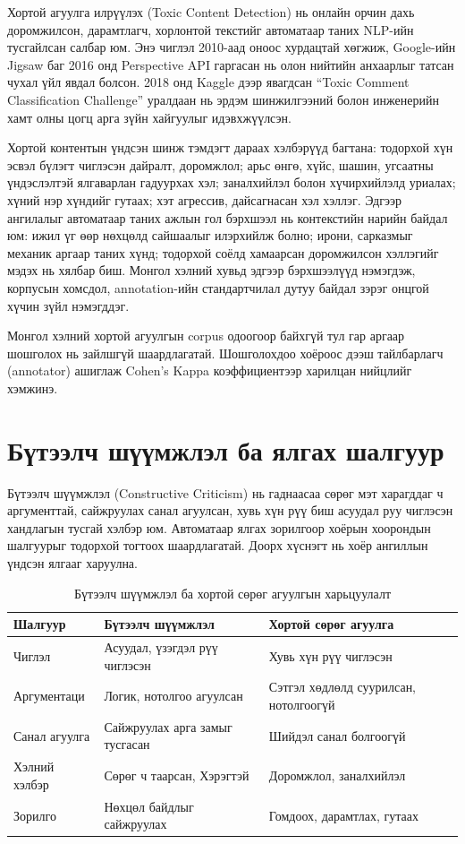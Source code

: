 Хортой агуулга илрүүлэх (Toxic Content Detection) нь онлайн орчин дахь
доромжилсон, дарамтлагч, хорлонтой текстийг автоматаар таних NLP-ийн
тусгайлсан салбар юм. Энэ чиглэл 2010-аад оноос хурдацтай хөгжиж, Google-ийн
Jigsaw баг 2016 онд Perspective API гаргасан нь олон нийтийн анхаарлыг татсан
чухал үйл явдал болсон. 2018 онд Kaggle дээр явагдсан ``Toxic Comment
Classification Challenge'' уралдаан нь эрдэм шинжилгээний болон инженерийн
хамт олны цогц арга зүйн хайгуулыг идэвхжүүлсэн.

Хортой контентын үндсэн шинж тэмдэгт дараах хэлбэрүүд багтана: тодорхой хүн
эсвэл бүлэгт чиглэсэн дайралт, доромжлол; арьс өнгө, хүйс, шашин, угсаатны
үндэслэлтэй ялгаварлан гадуурхах хэл; заналхийлэл болон хүчирхийлэлд уриалах;
хүний нэр хүндийг гутаах; хэт агрессив, дайсагнасан хэл хэллэг. Эдгээр
ангилалыг автоматаар таних ажлын гол бэрхшээл нь контекстийн нарийн байдал
юм: ижил үг өөр нөхцөлд сайшаалыг илэрхийлж болно; ирони, сарказмыг механик
аргаар таних хүнд; тодорхой соёлд хамаарсан доромжилсон хэллэгийг мэдэх нь
хялбар биш. Монгол хэлний хувьд эдгээр бэрхшээлүүд нэмэгдэж, корпусын
хомсдол, annotation-ийн стандартчилал дутуу байдал зэрэг онцгой хүчин зүйл
нэмэгддэг.

Монгол хэлний хортой агуулгын corpus одоогоор байхгүй тул гар аргаар шошголох
нь зайлшгүй шаардлагатай. Шошголохдоо хоёроос дээш тайлбарлагч (annotator)
ашиглаж Cohen's Kappa коэффициентээр харилцан нийцлийг хэмжинэ.

\section{Бүтээлч шүүмжлэл ба ялгах шалгуур}

Бүтээлч шүүмжлэл (Constructive Criticism) нь гаднаасаа сөрөг мэт харагддаг ч
аргументтай, сайжруулах санал агуулсан, хувь хүн рүү биш асуудал руу чиглэсэн
хандлагын тусгай хэлбэр юм. Автоматаар ялгах зорилгоор хоёрын хоорондын
шалгуурыг тодорхой тогтоох шаардлагатай. Доорх хүснэгт нь хоёр ангиллын
үндсэн ялгааг харуулна.

\begin{table}[ht]
  \centering
  \caption{Бүтээлч шүүмжлэл ба хортой сөрөг агуулгын харьцуулалт}
  \label{tab:constructive-vs-toxic}
  \begin{tabular}{lll}
    \toprule
    \textbf{Шалгуур} & \textbf{Бүтээлч шүүмжлэл} & \textbf{Хортой сөрөг агуулга} \\
    \midrule
    Чиглэл       & Асуудал, үзэгдэл рүү чиглэсэн & Хувь хүн рүү чиглэсэн \\
    Аргументаци  & Логик, нотолгоо агуулсан & Сэтгэл хөдлөлд суурилсан, нотолгоогүй \\
    Санал агуулга & Сайжруулах арга замыг тусгасан & Шийдэл санал болгоогүй \\
    Хэлний хэлбэр & Сөрөг ч таарсан, Хэрэгтэй & Доромжлол, заналхийлэл \\
    Зорилго       & Нөхцөл байдлыг сайжруулах & Гомдоох, дарамтлах, гутаах \\
    \bottomrule
  \end{tabular}
\end{table}

